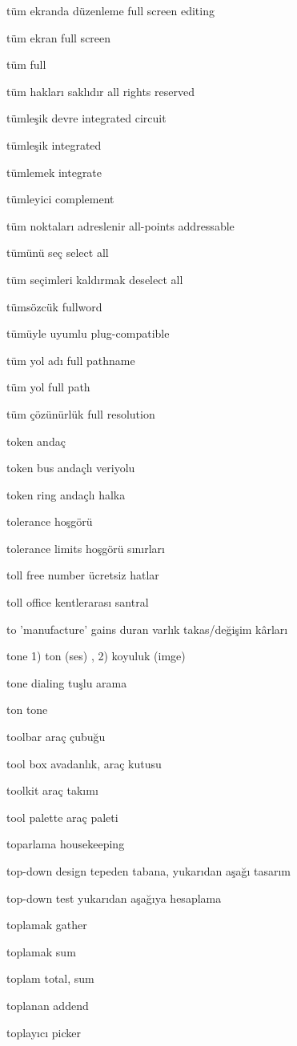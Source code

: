 \documentclass[12pt,fleqn]{article}\usepackage{../../common}
\begin{document}
tüm ekranda düzenleme full screen editing

tüm ekran full screen

tüm full

tüm hakları saklıdır all rights reserved

tümleşik devre integrated circuit

tümleşik integrated

tümlemek integrate

tümleyici complement

tüm noktaları adreslenir all-points addressable

tümünü seç select all

tüm seçimleri kaldırmak deselect all

tümsözcük fullword

tümüyle uyumlu plug-compatible

tüm yol adı full pathname

tüm yol full path

tüm çözünürlük full resolution

token andaç

token bus andaçlı veriyolu

token ring andaçlı halka

tolerance hoşgörü

tolerance limits hoşgörü sınırları

toll free number ücretsiz hatlar

toll office kentlerarası santral

to 'manufacture' gains duran varlık takas/değişim kârları

tone 1) ton (ses) , 2) koyuluk (imge)

tone dialing tuşlu arama

ton tone

toolbar araç çubuğu

tool box avadanlık, araç kutusu

toolkit araç takımı

tool palette araç paleti

toparlama housekeeping

top-down design tepeden tabana, yukarıdan aşağı tasarım

top-down test yukarıdan aşağıya hesaplama

toplamak gather

toplamak sum

toplam total, sum

toplanan addend

toplayıcı picker
\end{document}
